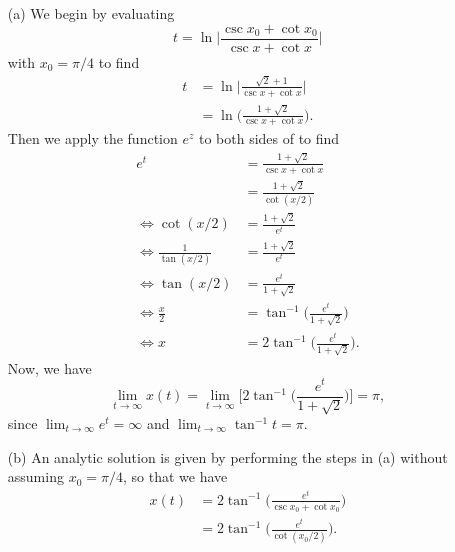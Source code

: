 
\begin{itemize}
    \item[(a)] We begin by evaluating 
        \[
            t = \ln{\biggl\lvert\frac{\csc{x_0} + \cot{x_0}}{\csc{x} + \cot{x}}\biggr\rvert}
        \]
        with $x_0 = \pi / 4$ to find
        \begin{equation*}
            \begin{split}
                t &= \ln{\biggl\lvert\frac{\sqrt{2} + 1}{\csc{x} + \cot{x}}\biggr\rvert} \\
                  &= \ln{\biggl(\frac{1 + \sqrt{2}}{\csc{x} + \cot{x}}\biggr)}.
            \end{split}
        \end{equation*}
        Then we apply the function $e^z$ to both sides of to find
        \begin{equation*}
            \begin{split}
                e^t &= \frac{1 + \sqrt{2}}{\csc{x} + \cot{x}} \\
                    &= \frac{1 + \sqrt{2}}{\cot{(x/2)}} \\
                \Leftrightarrow \cot{(x/2)} &= \frac{1 + \sqrt{2}}{e^t} \\
                \Leftrightarrow \frac{1}{\tan{(x/2)}} &= \frac{1 + \sqrt{2}}{e^t} \\
                \Leftrightarrow \tan{(x/2)} &= \frac{e^t}{1 + \sqrt{2}} \\
                \Leftrightarrow \frac{x}{2} &= \tan^{-1}{\biggl(\frac{e^t}{1 + \sqrt{2}}\biggr)} \\
                \Leftrightarrow x &= 2\tan^{-1}{\biggl(\frac{e^t}{1 + \sqrt{2}}\biggr)}.
            \end{split}
        \end{equation*}
        Now, we have
        \[
            \lim_{t \rightarrow \infty} x(t) = \lim_{t \rightarrow \infty}
            \biggl[2\tan^{-1}{\biggl(\frac{e^t}{1 + \sqrt{2}}\biggr)}\biggr] = \pi,
        \]
        since $\lim_{t \rightarrow \infty}e^t = \infty$ and 
        $\lim_{t \rightarrow \infty}\tan^{-1}{t} = \pi$.
    \item[(b)] An analytic solution is given by performing the steps in (a) without 
        assuming $x_0 = \pi / 4$, so that we have
        \begin{equation*}
            \begin{split}
                x(t) &= 2\tan^{-1}{\biggl(\frac{e^t}{\csc{x_0} + \cot{x_0}}\biggr)} \\
                     &= 2\tan^{-1}{\biggl(\frac{e^t}{\cot{(x_0/2)}}\biggr)}.
            \end{split}
        \end{equation*}
\end{itemize}
